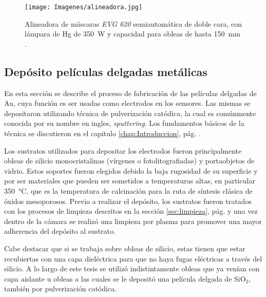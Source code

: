 			  \begin{figure}[h!]
			  \begin{center}
			  \texttt{[image: Imagenes/alineadora.jpg]}
			  \caption[Alineadora de máscaras]{Alineadora de máscaras \textit{EVG 620} semiautomática de doble cara, con lámpara de Hg de \SI{350}{W}  y capacidad para obleas de hasta \SI{150}{\mm} .}
			  \label{fig:alineadora}
			  \end{center}
			  \end{figure}

	\subsection{Depósito películas delgadas metálicas}\label{sec:sputt}

			En esta sección se describe el proceso de fabricación de las películas delgadas de Au, cuya función es ser usadas como electrodos en los sensores. Las mismas se depositaron utilizando técnica de pulverización catódica, la cual es comúnmente conocida por su nombre en ingles, \textit{sputtering}\cite{sigmund1968}. Los fundamentos básicos de la técnica se discutieron en el capitulo \ref{chap:Introduccion}, pág. \pageref{sec:microfabricacion}.
							
			Los sustratos utilizados para depositar los electrodos fueron principalmente obleas de silicio monocristalinas (vírgenes o fotolitografiadas) y portaobjetos de vidrio. Estos soportes fueron elegidos debido la baja rugosidad de su superficie y por ser materiales que pueden ser sometidos a temperaturas altas, en particular \SI{350}{\celsius}, que es la temperatura de calcinación para la ruta de síntesis clásica de óxidos mesoporosos. Previo a realizar el depósito, los sustratos fueron tratados con los procesos de limpieza descritos en la sección \ref{sec:limpieza}, pág. \pageref{sec:limpieza} y una vez dentro de la cámara se realizó una limpieza por plasma para promover una mayor adherencia del depósito al sustrato.

			Cabe destacar que si se trabaja sobre obleas de silicio, estas tienen que estar recubiertas con una capa dieléctrica para que no haya fugas eléctricas a través del silicio. A lo largo de este tesis se utilizó indistintamente obleas que ya venían con capa aislante u obleas a las cuales se le depositó una película delgada de SiO$_2$, también por pulverización catódica.

